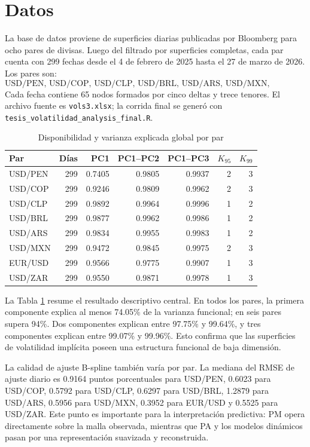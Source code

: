 \documentclass[a4paper,11pt]{article}
\newcommand{\SVIs}{superficies de volatilidad implícita}
\begin{document}
\section{Datos}

La base de datos proviene de superficies diarias publicadas por Bloomberg para ocho pares de divisas. Luego del filtrado por superficies completas, cada par cuenta con 299 fechas desde el 4 de febrero de 2025 hasta el 27 de marzo de 2026. Los pares son:
\[
\text{USD/PEN, USD/COP, USD/CLP, USD/BRL, USD/ARS, USD/MXN, EUR/USD, USD/ZAR.}
\]
Cada fecha contiene 65 nodos formados por cinco deltas y trece tenores. El archivo fuente es \texttt{vols3.xlsx}; la corrida final se generó con \texttt{tesis\_volatilidad\_analysis\_final.R}.

\begin{table}[H]
\centering
\caption{Disponibilidad y varianza explicada global por par}
\label{tab:fpca_global}
\small
\begin{tabular}{lrrrrrr}
\toprule
Par & Días & PC1 & PC1--PC2 & PC1--PC3 & \(K_{95}\) & \(K_{99}\) \\
\midrule
USD/PEN & 299 & 0.7405 & 0.9805 & 0.9937 & 2 & 3 \\
USD/COP & 299 & 0.9246 & 0.9809 & 0.9962 & 2 & 3 \\
USD/CLP & 299 & 0.9892 & 0.9964 & 0.9996 & 1 & 2 \\
USD/BRL & 299 & 0.9877 & 0.9962 & 0.9986 & 1 & 2 \\
USD/ARS & 299 & 0.9834 & 0.9955 & 0.9983 & 1 & 2 \\
USD/MXN & 299 & 0.9472 & 0.9845 & 0.9975 & 2 & 3 \\
EUR/USD & 299 & 0.9566 & 0.9775 & 0.9907 & 1 & 3 \\
USD/ZAR & 299 & 0.9550 & 0.9871 & 0.9978 & 1 & 3 \\
\bottomrule
\end{tabular}
\end{table}

La Tabla \ref{tab:fpca_global} resume el resultado descriptivo central. En todos los pares, la primera componente explica al menos 74.05\% de la varianza funcional; en seis pares supera 94\%. Dos componentes explican entre 97.75\% y 99.64\%, y tres componentes explican entre 99.07\% y 99.96\%. Esto confirma que las \SVIs{} poseen una estructura funcional de baja dimensión.

La calidad de ajuste B-spline también varía por par. La mediana del RMSE de ajuste diario es 0.9164 puntos porcentuales para USD/PEN, 0.6023 para USD/COP, 0.5792 para USD/CLP, 0.6297 para USD/BRL, 1.2879 para USD/ARS, 0.5956 para USD/MXN, 0.3952 para EUR/USD y 0.5525 para USD/ZAR. Este punto es importante para la interpretación predictiva: PM opera directamente sobre la malla observada, mientras que PA y los modelos dinámicos pasan por una representación suavizada y reconstruida.
\end{document}
